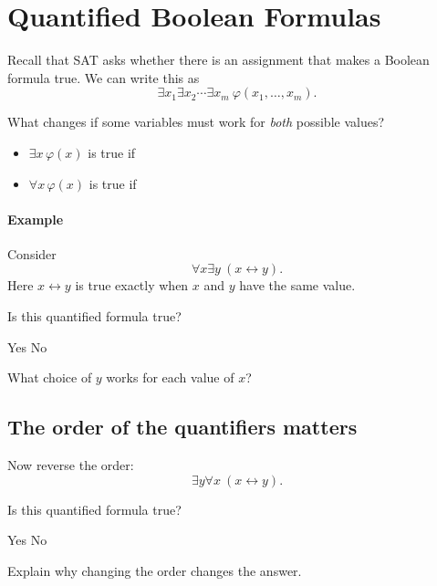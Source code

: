 \documentclass[11  pt]{article}
\begin{document}
\newpage
\section{Quantified Boolean Formulas}
Recall that SAT asks whether there is an assignment that makes a Boolean formula true. We can write this as
\begin{equation*}
    \exists x_1\exists x_2\cdots\exists x_m\ \varphi(x_1,\ldots,x_m).
\end{equation*}

What changes if some variables must work for \emph{both} possible values?
\begin{itemize}
    \item $\exists x\,\varphi(x)$ is true if 
    \vs{.5cm}
    \item $\forall x\,\varphi(x)$ is true if 
\end{itemize}

\paragraph{Example}
Consider
\begin{equation*}
    \forall x\exists y\ (x\leftrightarrow y).
\end{equation*}
Here $x\leftrightarrow y$ is true exactly when $x$ and $y$ have the same value.

\begin{Qu}
    Is this quantified formula true?
    \begin{itemize}
        \aitem Yes
        \bitem No
    \end{itemize}
\end{Qu}
What choice of $y$ works for each value of $x$?
\vs{1cm}

\newpage
\subsection*{The order of the quantifiers matters}
Now reverse the order:
\begin{equation*}
    \exists y\forall x\ (x\leftrightarrow y).
\end{equation*}

\begin{Qu}
    Is this quantified formula true?
    \begin{itemize}
        \aitem Yes
        \bitem No
    \end{itemize}
\end{Qu}
Explain why changing the order changes the answer.
\vs{1.5cm}
\end{document}
